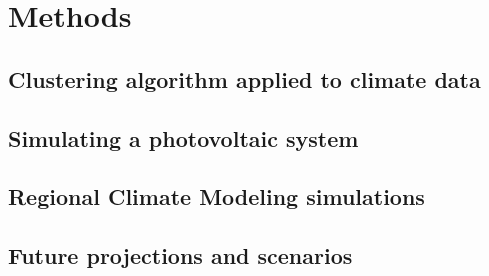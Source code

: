 \chapter{Methods\label{cha:methods}}
\section{Clustering algorithm applied to climate data}
\section{Simulating a photovoltaic system}
\section{Regional Climate Modeling simulations}
\section{Future projections and scenarios}
